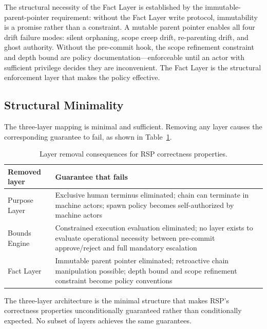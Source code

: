 The structural necessity of the Fact Layer is established by the immutable-parent-pointer requirement: without the Fact Layer write protocol, immutability is a promise rather than a constraint. A mutable parent pointer enables all four drift failure modes: silent orphaning, scope creep drift, re-parenting drift, and ghost authority. Without the pre-commit hook, the scope refinement constraint and depth bound are policy documentation---enforceable until an actor with sufficient privilege decides they are inconvenient. The Fact Layer is the structural enforcement layer that makes the policy effective.

\subsection{Structural Minimality}
\label{sec:rs-minimality}

The three-layer mapping is minimal and sufficient. Removing any layer causes the corresponding guarantee to fail, as shown in Table~\ref{tab:layer-minimality-rs}.

\begin{table}[h]
\centering
\begin{tabular}{p{3.2cm} p{4.8cm}}
\toprule
\textbf{Removed layer} & \textbf{Guarantee that fails} \\
\midrule
Purpose Layer & Exclusive human terminus eliminated; chain can terminate in machine actors; spawn policy becomes self-authorized by machine actors \\
Bounds Engine & Constrained execution evaluation eliminated; no layer exists to evaluate operational necessity between pre-commit approve/reject and full mandatory escalation \\
Fact Layer & Immutable parent pointer eliminated; retroactive chain manipulation possible; depth bound and scope refinement constraint become policy conventions \\
\bottomrule
\end{tabular}
\caption{Layer removal consequences for RSP correctness properties.}
\label{tab:layer-minimality-rs}
\end{table}

The three-layer architecture is the minimal structure that makes RSP's correctness properties unconditionally guaranteed rather than conditionally expected. No subset of layers achieves the same guarantees.

